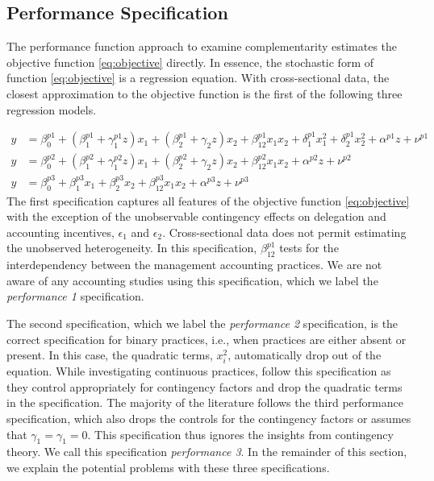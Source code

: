 \documentclass[12pt]{article}
\begin{document}
\subsection{Performance Specification}

The performance function approach to examine complementarity estimates the objective function \eqref{eq:objective} directly. In essence, the stochastic form of function \eqref{eq:objective} is a regression equation. With cross-sectional data, the closest approximation to the objective function is the first of the following three regression models.  

\begin{align*}
y &=  \beta^{p1}_0 + (\beta^{p1}_{1} + \gamma_1^{p1} z )x_1 
						+ (\beta_{2}^{p1} + \gamma_2 z ) x_2 
                        + \beta_{12}^{p1} x_1 x_2 
                        + \delta_1^{p1} x^2_1 + \delta_2^{p1} x^2_2 
                        + \alpha^{p1} z
                        + \nu^{p1} \\
 y &=  \beta^{p2}_0 + (\beta^{p2}_{1} + \gamma_1^{p2} z )x_1 
						+ (\beta_{2}^{p2} + \gamma_2 z ) x_2 
                        + \beta_{12}^{p2} x_1 x_2 
                        + \alpha^{p2} z
                        + \nu^{p2} \\
 y &=  \beta^{p3}_0 + \beta^{p3}_{1} x_1 
						+ \beta_{2}^{p3} x_2 
                        + \beta_{12}^{p3} x_1 x_2 
                        + \alpha^{p3} z
                        + \nu^{p3}
\end{align*}
The first specification captures all features of the objective function \eqref{eq:objective} with the exception of the unobservable contingency effects on delegation and accounting incentives, $\epsilon_1$ and $\epsilon_2$. Cross-sectional data does not permit estimating the unobserved heterogeneity. In this specification, \(\beta_{12}^{p1}\) tests for the interdependency between the management accounting practices. We are not aware of any accounting studies using this specification, which we label the \emph{performance 1} specification. 

The second specification, which we label the \emph{performance 2} specification, is the correct specification for binary practices, i.e., when practices are either absent or present. In this case, the quadratic terms, $x_i^2$, automatically drop out of the equation. While investigating continuous practices, \citet{ bedford_management_2016, bedford_performance_2019} follow this specification as they control appropriately for contingency factors and drop the quadratic terms in the specification. The majority of the literature follows the third performance specification, which also drops the controls for the contingency factors or assumes that $\gamma_1 = \gamma_1 = 0$. This specification thus ignores the insights from contingency theory. We call this specification \emph{performance 3}. In the remainder of this section, we explain the potential problems with these three specifications.
\end{document}
